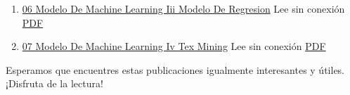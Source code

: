 \documentclass[
  jou,
  floatsintext,
  longtable,
  a4paper,
  nolmodern,
  notxfonts,
  notimes,
  colorlinks=true,linkcolor=blue,citecolor=blue,urlcolor=blue]{apa7}
\begin{document}
\begin{enumerate}
\item
  \href{https://achalmaedison.netlify.app/programacion-software/r/2022-11-21-06-modelo-de-machine-learning-iii-modelo-de-regresion}{06
  Modelo De Machine Learning Iii Modelo De Regresion} Lee sin conexión
  \href{https://achalmaedison.netlify.app/programacion-software/r/2022-11-21-06-modelo-de-machine-learning-iii-modelo-de-regresion/index.pdf}{PDF}
\item
  \href{https://achalmaedison.netlify.app/programacion-software/r/2022-11-28-07-modelo-de-machine-learning-iv-tex-mining}{07
  Modelo De Machine Learning Iv Tex Mining} Lee sin conexión
  \href{https://achalmaedison.netlify.app/programacion-software/r/2022-11-28-07-modelo-de-machine-learning-iv-tex-mining/index.pdf}{PDF}
\end{enumerate}

Esperamos que encuentres estas publicaciones igualmente interesantes y
útiles. ¡Disfruta de la lectura!
\end{document}
